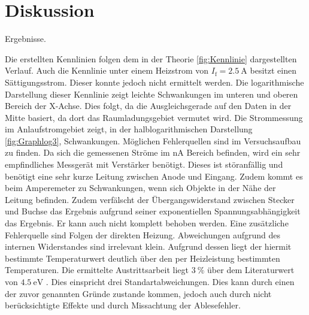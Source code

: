 
\section{Diskussion}
\label{sec:Diskussion}

 \begin{table}
 	\centering
 	\caption{Ergebnisse.}
 	
 \end{table}

Die erstellten Kennlinien folgen dem in der Theorie \ref{fig:Kennlinie} dargestellten Verlauf.
 Auch die Kennlinie unter einem Heizstrom von $I_\text{f} = \SI{2.5}{\ampere}$
 besitzt einen Sättigungsstrom. Dieser konnte jedoch nicht ermittelt werden.
Die logarithmische Darstellung dieser Kennlinie zeigt leichte Schwankungen im
unteren und oberen Bereich der X-Achse. Dies folgt, da die Ausgleichsgerade auf
den Daten in der Mitte basiert, da dort das Raumladungsgebiet vermutet wird.
Die Strommessung im Anlaufstromgebiet zeigt, in der halblogarithmischen
Darstellung \ref{fig:Graphlog3}, Schwankungen. Möglichen Fehlerquellen sind im
Versuchsaufbau zu finden. Da sich die gemessenen Ströme im $\si{\nano\ampere}$
Bereich befinden, wird ein sehr empfindliches Messgerät mit Verstärker benötigt.
Dieses ist störanfällig und benötigt eine sehr kurze Leitung zwischen Anode und Eingang.
Zudem kommt es beim Amperemeter zu Schwankungen, wenn sich Objekte in der Nähe der
Leitung befinden. Zudem verfälscht der Übergangswiderstand zwischen Stecker und
Buchse das Ergebnis aufgrund seiner exponentiellen Spannungsabhängigkeit das Ergebnis.
 Er kann auch nicht komplett behoben werden. Eine zusätzliche Fehlerquelle sind
 Folgen der direkten Heizung. Abweichungen aufgrund des internen Widerstandes
 sind irrelevant klein. Aufgrund dessen liegt der hiermit bestimmte Temperaturwert
 deutlich über den per Heizleistung bestimmten Temperaturen. Die ermittelte
 Austrittsarbeit liegt $\SI{3}{\percent}$ über dem Literaturwert von $\SI{4.5}{\electronvolt}$ \cite{wolfaus}. Dies einspricht drei Standartabweichungen. Dies kann durch einen der zuvor genannten Gründe zustande kommen, jedoch auch durch nicht berücksichtigte Effekte und durch Missachtung der Ablesefehler.
